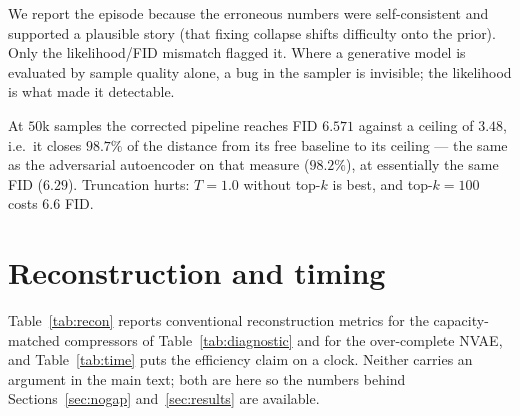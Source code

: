 \documentclass[sigconf,nonacm]{acmart}
\begin{document}
We report the episode because the erroneous numbers were self-consistent and
supported a plausible story (that fixing collapse shifts difficulty onto the
prior). Only the likelihood/FID mismatch flagged it. Where a generative model is
evaluated by sample quality alone, a bug in the sampler is invisible; the
likelihood is what made it detectable.

At $50$k samples the corrected pipeline reaches FID $6.571$ against a ceiling of
$3.48$, i.e.\ it closes $98.7\%$ of the distance from its free baseline to its
ceiling --- the same as the adversarial autoencoder on that measure ($98.2\%$),
at essentially the same FID ($6.29$). Truncation hurts: $T{=}1.0$ without top-$k$ is
best, and top-$k{=}100$ costs $6.6$ FID.

\section{Reconstruction and timing}
\label{app:support}

Table~\ref{tab:recon} reports conventional reconstruction metrics for the
capacity-matched compressors of Table~\ref{tab:diagnostic} and for the
over-complete NVAE, and Table~\ref{tab:time} puts the
efficiency claim on a clock. Neither carries an argument in the main text; both
are here so the numbers behind Sections~\ref{sec:nogap} and~\ref{sec:results}
are available.
\end{document}
